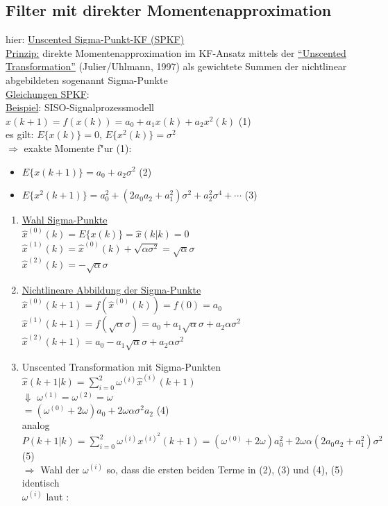 \documentclass[openany,a4paper,11pt]{book}
\begin{document}
\subsection{Filter mit direkter Momentenapproximation}
hier: \uline{Unscented Sigma-Punkt-KF (SPKF)}\\
\uline{Prinzip:} direkte Momentenapproximation im KF-Ansatz mittels der \uline{``Unscented Transformation''} (Julier/Uhlmann, 1997) als gewichtete Summen der nichtlinear abgebildeten sogenannt Sigma-Punkte\\
\uline{Gleichungen SPKF}: \\
\uline{Beispiel}: SISO-Signalprozessmodell \\
$x(k+1)=f(x(k))=a_0+a_1x(k)+a_2x^2(k)$ \quad (1)\\
es gilt: $E\{x(k)\}=0$, $E\{x^2(k)\}=\sigma^2$\\
$\Rightarrow$ exakte Momente f"ur (1): \begin{itemize}
    \item $E\{x(k+1)\}=a_0+a_2\sigma^2$ \quad (2)
    \item $E\{x^2(k+1)\}=a_0^2+(2a_0a_2+a_1^2)\sigma^2+a_2^2\sigma^4+\cdots$ \quad (3)
\end{itemize}
\begin{enumerate}
    \item \uline{Wahl Sigma-Punkte}\\
    $\hat{x}^{(0)}(k)=E\{x(k)\}=\hat{x}(k|k)=0$\\
    $\hat{x}^{(1)}(k)=\hat{x}^{(0)}(k)+\sqrt{\alpha\sigma^2}=\sqrt{\alpha}\sigma$\\
    $\hat{x}^{(2)}(k)=-\sqrt{\alpha}\sigma$
    \item \uline{Nichtlineare Abbildung der Sigma-Punkte}\\
    $\hat{x}^{(0)}(k+1)=f(\hat{x}^{(0)}(k))=f(0)=a_0$\\
    $\hat{x}^{(1)}(k+1)=f(\sqrt{\alpha}\sigma)=a_0+a_1\sqrt{\alpha}\sigma+a_2\alpha\sigma^2$\\
    $\hat{x}^{(2)}(k+1)=a_0-a_1\sqrt{\alpha}\sigma+a_2\alpha\sigma^2$
    \item Unscented Transformation mit Sigma-Punkten\\
    $\displaystyle\hat{x}(k+1|k)=\sum_{i=0}^2\omega^{(i)}\hat{x}^{(i)}(k+1)$\\
    $\Downarrow$ $\omega^{(1)}=\omega^{(2)}=\omega$\\
    $=(\omega^{(0)}+2\omega)a_0+2\omega\alpha\sigma^2a_2$ \quad (4)\\
    analog $P(k+1|k)=\sum_{i=0}^2\omega^{(i)}x^{(i)^2}(k+1)=(\omega^{(0)}+2\omega)a_0^2+2\omega\alpha(2a_0a_2+a_1^2)\sigma^2$ \quad (5)\\
    $\Rightarrow$ Wahl der $\omega^{(i)}$ so, dass die ersten beiden Terme in (2), (3) und (4), (5) identisch\\
    $\omega^{(i)}$ laut :\\ 
\end{enumerate}
\end{document}
